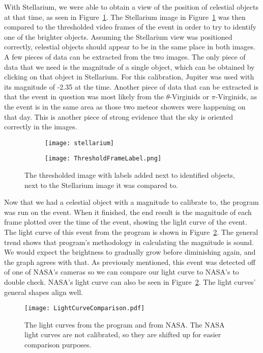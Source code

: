 With Stellarium, we were able to obtain a view of the position of celestial objects at that time, as seen in Figure~\ref{fig:Starposition}. The Stellarium image in Figure~\ref{fig:Starposition} was then compared to the thresholded video frames of the event in order to try to identify one of the brighter objects. Assuming the Stellarium view was positioned correctly, celestial objects should appear to be in the same place in both images. A few pieces of data can be extracted from the two images. The only piece of data that we need is the magnitude of a single object, which can be obtained by clicking on that object in Stellarium. For this calibration, Jupiter was used with its magnitude of -2.35 at the time. Another piece of data that can be extracted is that the event in question was most likely from the $\theta$-Virginids or $\pi$-Virginids, as the event is in the same area as those two meteor showers were happening on that day. This is another piece of strong evidence that the sky is oriented correctly in the images.

\begin{figure}
\centering
\begin{subfigure}{.4\textwidth}
	\centering
	\texttt{[image: stellarium]}
\end{subfigure}%
\begin{subfigure}{.4\textwidth}
	\centering
	\texttt{[image: ThresholdFrameLabel.png]}
\end{subfigure}
\caption{The thresholded image with labels added next to identified objects, next to the Stellarium image it was compared to.}
\label{fig:Starposition}
\end{figure}

Now that we had a celestial object with a magnitude to calibrate to, the program was run on the event. When it finished, the end result is the magnitude of each frame plotted over the time of the event, showing the light curve of the event. The light curve of this event from the program is shown in Figure~\ref{fig:nasa}. The general trend shows that program's methodology in calculating the magnitude is sound. We would expect the brightness to gradually grow before diminishing again, and the graph agrees with that. As previously mentioned, this event was detected off of one of NASA's cameras so we can compare our light curve to NASA's to double check. NASA's light curve can also be seen in Figure~\ref{fig:nasa}. The light curves' general shapes align well.

\begin{figure}[ht!]
	\centering
	\texttt{[image: LightCurveComparison.pdf]}
	\caption{The light curves from the program and from NASA. The NASA light curves are not calibrated, so they are shifted up for easier comparison purposes.}
	\label{fig:nasa}
\end{figure}

